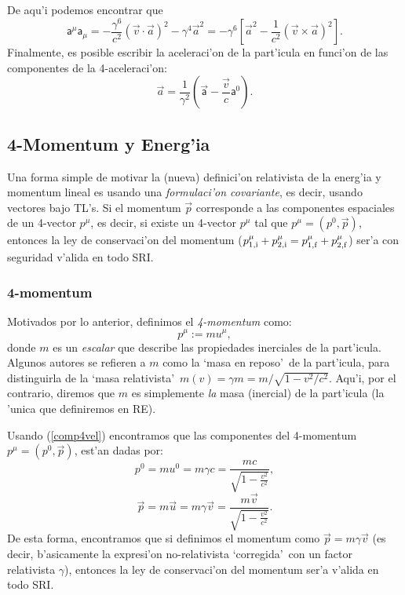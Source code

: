 De aqu'i podemos encontrar que
\begin{equation}
 \mathsf{a}^\mu\mathsf{a}_\mu=-\frac{\gamma^6}{c^2}(\vec{v}\cdot\vec{a})^2-\gamma^4\vec{a}^2=-\gamma^6\left[\vec{a}^2-\frac{1}{c^2}(\vec{v}\times\vec{a})^2\right]. \label{4a2}
\end{equation}
Finalmente, es posible escribir la aceleraci'on de la part'icula en funci'on de
las componentes de la 4-aceleraci'on:
\begin{equation}
\vec{a}=\frac{1}{\gamma^2}\left(\vec{\mathsf{a}}-\frac{\vec{v}}{c}\mathsf{a}
^0\right).
\end{equation}


\subsection{4-Momentum y Energ'ia}

Una forma simple de motivar la (nueva) definici'on relativista de la energ'ia y momentum lineal es usando una \textit{formulaci'on covariante}, es decir, usando vectores bajo TL's. Si el
momentum $\vec{p}$ corresponde a las componentes espaciales de un 4-vector
$p^\mu$, es decir, si existe un 4-vector $p^\mu$ tal que $p^\mu=(p^0,\vec{p})$, entonces la ley de conservaci'on del momentum
($p^\mu_{\rm 1,i}+p^\mu_{2,\rm i}=p^\mu_{1,\rm f}+p^\mu_{2,\rm f}$) ser'a con seguridad v'alida en
todo SRI.

\subsubsection{4-momentum}
Motivados por lo anterior, definimos el \textit{4-momentum} como:
\begin{equation}
\boxed{p^\mu :=mu^\mu, \label{def4mom}}
\end{equation}
donde $m$ es un \textit{escalar} que describe las propiedades inerciales de la
part'icula. Algunos autores se refieren a $m$ como la `masa en reposo'\ de la
part'icula, para distinguirla de la `masa relativista'\ $m(v)=\gamma
m={m}/{\sqrt{1-{v^2}/{c^2}}}$. Aqu'i, por el contrario, diremos que $m$
es simplemente \textit{la} masa (inercial) de la part'icula (la 'unica que
definiremos en RE).

Usando (\ref{comp4vel}) encontramos que las componentes del 4-momentum
$p^\mu=(p^0,\vec{p})$, est'an dadas por:
\begin{equation}
\boxed{p^0=m u^0=m\gamma c=\frac{mc}{\sqrt{1-\frac{v^2}{c^2}}}},
\end{equation}
\begin{equation}
\boxed{\vec{p}=m \vec{u}=m\gamma \vec{v}=\frac{m\vec{v}}{\sqrt{1-\frac{v^2}{c^2}}}.}
\end{equation}
De esta forma, encontramos que si definimos el momentum como
$\vec{p}=m\gamma\vec{v}$ (es decir, b'asicamente la expresi'on no-relativista
`corregida'\ con un factor relativista $\gamma$), entonces la ley de
conservaci'on del momentum ser'a v'alida en todo SRI.


